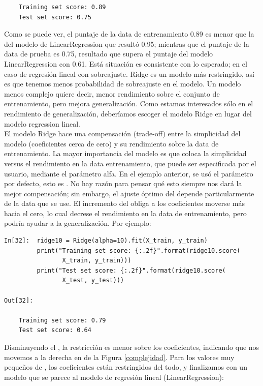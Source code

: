 {\begin{lstlisting}
    Training set score: 0.89
    Test set score: 0.75

\end{lstlisting}
	
 
 Como se puede ver, el puntaje de la data de entrenamiento 0.89 es menor que la del modelo de {\ttfamily LinearRegression}  que resultó 0.95; mientras que el puntaje de la data de prueba es 0.75, resultado que supera el puntaje  del modelo {\ttfamily LinearRegression} con 0.61. Está situación es consistente con lo esperado; en el caso de regresión lineal con sobreajuste. Ridge es un modelo más restringido, así es que tenemos menos probabilidad de sobreajuste en el modelo.  Un modelo menos complejo quiere decir, menor rendimiento  sobre el conjunto de entrenamiento, pero mejora generalización. Como estamos  interesados sólo  en el rendimiento de generalización, deberíamos escoger el modelo Ridge en lugar del modelo regression lineal.\\
 

 El modelo  Ridge  hace una compensación (trade-off) entre la simplicidad del modelo (coeficientes cerca de cero) y su rendimiento sobre la data de entrenamiento. La mayor importancia del modelo es que coloca la simplicidad versus el rendimiento en la data entrenamiento, que puede ser especificada por el usuario, mediante el parámetro alfa. En el ejemplo anterior, se usó el parámetro {} por defecto, esto es   {}. No hay razón para pensar qué esto siempre nos dará la mejor compensación; sin embargo, el ajuste óptimo del  {} depende particularmente de la data que se use.  El incremento del {} obliga a los coeficientes moverse más hacia el cero, lo cual decrese el rendimiento en la data de entrenamiento,  pero podría ayudar a la generalización. Por ejemplo:\\


\begin{lstlisting}
In[32]:  ridge10 = Ridge(alpha=10).fit(X_train, y_train)
         print("Training set score: {:.2f}".format(ridge10.score(
                X_train, y_train)))
         print("Test set score: {:.2f}".format(ridge10.score(
                X_test, y_test)))

Out[32]:
    
    Training set score: 0.79
    Test set score: 0.64

\end{lstlisting}

Disminuyendo el {}, la  restricción es menor sobre los coeficientes, indicando que nos movemos a la derecha en de la Figura \ref{complejidad}. Para los valores muy pequeños de {}, los coeficientes están restringidos del todo, y finalizamos con un modelo que se parece al modelo de regresión lineal (LinearRegression):\\


}
